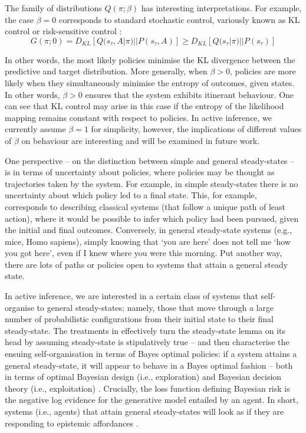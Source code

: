 \documentclass[review,12pt,authoryear]{elsarticle}
\begin{document}
The family of distributions $Q(\pi; \beta)$ has interesting interpretations. For example, the case $\beta=0$ corresponds to standard stochastic control, variously known as KL control or risk-sensitive control \citep{vandenbroekRiskSensitivePath2010}: 
\begin{equation*}
    G(\pi; 0) = D_{KL}[Q(s_\tau, A|\pi)||P(s_\tau, A)] \geq D_{KL}[Q(s_\tau |\pi)||P(s_\tau)]
\end{equation*}

In other words, the most likely policies minimise the KL divergence between the predictive and target distribution. More generally, when $\beta >0$, policies are more likely when they simultaneously minimise the entropy of outcomes, given states. In other words, $\beta >0$ ensures that the system exhibits itinerant behaviour. One can see that KL control may arise in this case if the entropy of the likelihood mapping remains constant with respect to policies. In active inference, we currently assume $\beta =1$ for simplicity, however, the implications of different values of $\beta$ on behaviour are interesting and will be examined in future work.

One perspective – on the distinction between simple and general steady-states – is in terms of uncertainty about policies, where policies may be thought as trajectories taken by the system. For example, in simple steady-states there is no uncertainty about which policy led to a final state. This, for example, corresponds to describing classical systems (that follow a unique path of least action), where it would be possible to infer which policy had been pursued, given the initial and final outcomes. Conversely, in general steady-state systems (e.g., mice, Homo sapiens), simply knowing that ‘you are here’ does not tell me ‘how you got here’, even if I knew where you were this morning. Put another way, there are lots of paths or policies open to systems that attain a general steady state.

In active inference, we are interested in a certain class of systems that self-organise to general steady-states; namely, those that move through a large number of probabilistic configurations from their initial state to their final steady-state. The treatments in \citep{parrMarkovBlanketsInformation2020,fristonFreeEnergyPrinciple2019} effectively turn the steady-state lemma on its head by assuming steady-state is stipulatively true – and then characterise the ensuing self-organisation in terms of Bayes optimal policies: if a system attains a general steady-state, it will appear to behave in a Bayes optimal fashion – both in terms of optimal Bayesian design (i.e., exploration) and Bayesian decision theory (i.e., exploitation) \citep{fristonSophisticatedInference2020}. Crucially, the loss function defining Bayesian risk is the negative log evidence for the generative model entailed by an agent. In short, systems (i.e., agents) that attain general steady-states will look as if they are responding to epistemic affordances \citep{parrWorkingMemoryAttention2017}.
\end{document}
